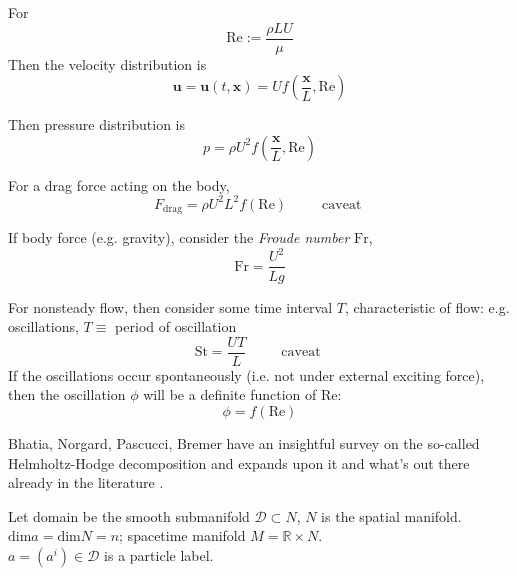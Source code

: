\documentclass[twoside,landscape,10pt]{amsart}
\theoremstyle{plain}
\theoremstyle{definition}
\theoremstyle{remark}
\theoremstyle{remark}
\begin{document}
\begin{multicols*}{2}
For
\begin{equation}
  \text{Re} := \frac{ \rho L U }{ \mu }
  \end{equation}
Then the velocity distribution is
\[
\mathbf{u} = \mathbf{u}(t,\mathbf{x}) = Uf\left( \frac{ \mathbf{x} }{L}, \text{Re} \right)
\]

Then pressure distribution is
\[
p = \rho U^2 f\left( \frac{\mathbf{x}}{L}, \text{Re} \right)
\]

For a drag force acting on the body,
\[
F_{\text{drag}} = \rho U^2 L^2 f(\text{Re}) \qquad \, \text{ caveat }
\]

If body force (e.g. gravity), consider the \emph{Froude number} $\text{Fr}$,
\begin{equation}
  \text{Fr} = \frac{U^2 }{ L g}
  \end{equation}

For nonsteady flow, then consider some time interval $T$, characteristic of flow: e.g. oscillations, $T \equiv $ period of oscillation
\[
\text{St}  = \frac{ UT}{L} \qquad \, \text{ caveat }
\]
If the oscillations occur spontaneously (i.e. not under external exciting force), then the oscillation $\phi$ will be a definite function of $\text{Re}$:
\[
\phi = f(\text{Re})
\]



Bhatia, Norgard, Pascucci, Bremer have an insightful survey on the so-called Helmholtz-Hodge decomposition and expands upon it and what's out there already in the literature \cite{HBhatiaGNorgardVPascucciPBremer2013}.  





Let domain be the smooth submanifold $\mathcal{D} \subset N$, $N$ is the spatial manifold. $\text{dim}a = \text{dim}N=n$; spacetime manifold $M = \mathbb{R}\times N$.  \\
\phantom{Let} $a =(a^i) \in \mathcal{D}$ is a particle label.  



\end{multicols*}
\end{document}
